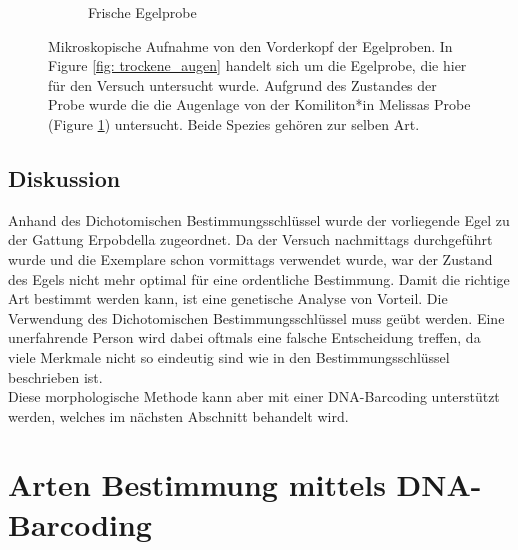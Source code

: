 \documentclass[oneside,10pt,a4paper]{report}
\begin{document}
\begin{figure}[H]
\begin{subfigure}[b]{0.37\textwidth}
						\caption{Frische Egelprobe}
						\label{fig:feuchte_augen}
					\end{subfigure}
					\caption{Mikroskopische Aufnahme von den Vorderkopf der Egelproben. In Figure \ref{fig: trockene_augen} handelt sich um die Egelprobe, die hier für den Versuch untersucht wurde. Aufgrund des Zustandes der Probe wurde die die Augenlage von der Komiliton*in Melissas Probe (Figure \ref{fig:feuchte_augen}) untersucht. Beide Spezies gehören zur selben Art.}
					\label{fig: Dicho_augent}
				\end{figure}
			
			
			\subsection{Diskussion}
				Anhand des Dichotomischen Bestimmungsschlüssel wurde der vorliegende Egel zu der Gattung Erpobdella zugeordnet.
				Da der Versuch nachmittags durchgeführt wurde und die Exemplare schon vormittags verwendet wurde, war der Zustand des Egels nicht mehr optimal für eine ordentliche Bestimmung.
				Damit die richtige Art bestimmt werden kann, ist eine genetische Analyse von Vorteil. Die Verwendung des Dichotomischen Bestimmungsschlüssel muss geübt werden. Eine unerfahrende Person wird dabei oftmals eine falsche Entscheidung treffen, da viele Merkmale nicht so eindeutig sind wie in den Bestimmungsschlüssel beschrieben ist.\\
				Diese morphologische Methode kann aber mit einer DNA-Barcoding unterstützt werden, welches im nächsten Abschnitt behandelt wird.
		
		\section{Arten Bestimmung mittels DNA-Barcoding}
\end{document}
